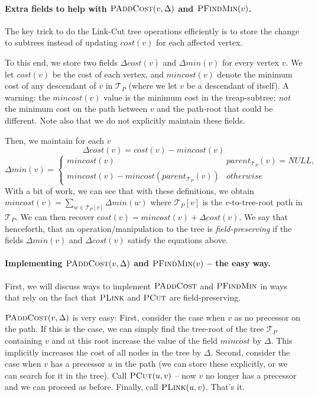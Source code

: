 \paragraph{Extra fields to help with $\textsc{PAddCost}(v, \Delta)$ and $\textsc{PFindMin}(v)$.} The key trick to do the Link-Cut tree operations efficiently is to store the change to subtrees instead of updating $cost(v)$ for each affected vertex. 

To this end, we store two fields $\Delta cost(v)$ and $\Delta min(v)$ for every vertex $v$. We let $cost(v)$ be the cost of each vertex, and $mincost(v)$ denote the minimum cost of any descendant of $v$ in $\mathcal{T}_{P}$ (where we let $v$ be a descendant of itself). 
A warning: the $mincost(v)$ value is the minimum cost in the treap-subtree; \emph{not} the minimum cost on the path between $v$ and the path-root that could be different.
Note also that we do not explicitly maintain these fields.

Then, we maintain for each $v$
\[
    \Delta cost(v) = cost(v) - mincost(v)
\]
\[
    \Delta min(v) = \begin{cases}
    mincost(v) & parent_{\mathcal{T}_{P}}(v) = NULL, \\
    mincost(v) - mincost(parent_{\mathcal{T}_{P}}(v)) & otherwise\end{cases}
\]
With a bit of work, we can see that with these definitions, we obtain $mincost(v) = \sum_{w \in \mathcal{T}_{P}[v]} \Delta min(w)$ where $\mathcal{T}_{P}[v]$ is the $v$-to-tree-root path in $\mathcal{T}_{P}$. We can then recover $cost(v) = mincost(v) + \Delta cost(v)$. We say that henceforth, that an operation/manipulation to the tree is \emph{field-preserving} if the fields  $\Delta min(v)$ and $\Delta cost(v)$ satisfy the equations above.

\paragraph{Implementing $\textsc{PAddCost}(v, \Delta)$ and $\textsc{PFindMin}(v)$ -- the easy way.}
First, we will discuss ways to implement $\textsc{PAddCost}$ and $\textsc{PFindMin}$ in ways that rely on the fact that $\textsc{PLink}$ and $\textsc{PCut}$ are field-preserving.

$\textsc{PAddCost}(v, \Delta)$ is very easy: First, consider the case when $v$ as no precessor on the path. If this is the case, we can simply find the tree-root of the tree $\mathcal{T}_{P}$ containing $v$ and at this root increase the value of the field $mincost$ by $\Delta$. This implicitly increases the cost of all nodes in the tree by $\Delta$.
Second, consider the case when $v$ has a precessor $u$ in the path (we can store these explicitly, or we can search for it in the tree). Call $\textsc{PCut}(u,v)$ -- now $v$ no longer has a precessor and we can proceed as before. Finally, call $\textsc{PLink}(u,v)$. That's it.

